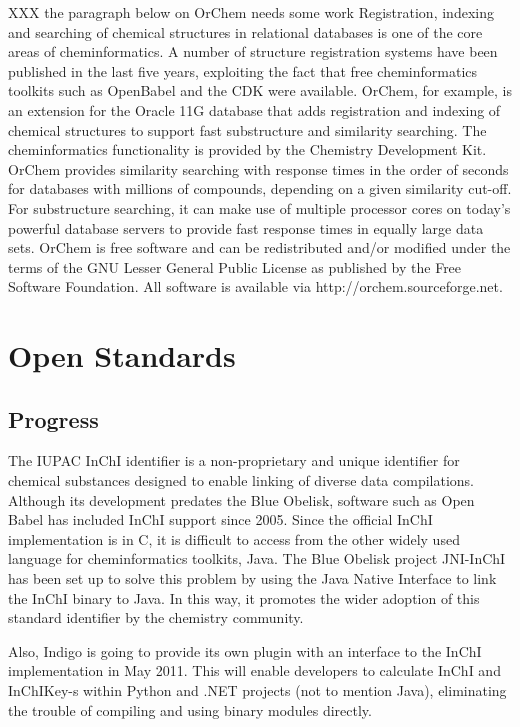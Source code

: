 \documentclass[10pt]{bmc_article}
\newenvironment{bmcformat}{\begin{raggedright}\baselineskip20pt\sloppy\setboolean{publ}{false}}{\end{raggedright}\baselineskip20pt\sloppy}
\begin{document}
\begin{bmcformat}
XXX the paragraph below on OrChem needs some work
Registration, indexing and searching of chemical structures in relational databases is one of the core areas of cheminformatics.
A number of structure registration systems have been published in the last five years, exploiting the fact that
free cheminformatics toolkits such as OpenBabel and the CDK were available.
OrChem, for example, is an extension for the Oracle 11G database that adds registration and indexing of chemical structures to support fast substructure and similarity searching. The cheminformatics functionality is provided by the Chemistry Development Kit. OrChem provides similarity searching with response times in the order of seconds for databases with millions of compounds, depending on a given similarity cut-off. For substructure searching, it can make use of multiple processor cores on today's powerful database servers to provide fast response times in equally large data sets.
OrChem is free software and can be redistributed and/or modified under the terms of the GNU Lesser General Public License as published by the Free Software Foundation. All software is available via http://orchem.sourceforge.net.

\section*{Open Standards}
  \subsection*{Progress}

The IUPAC InChI identifier is a non-proprietary and unique identifier
for chemical substances designed to enable linking of diverse data
compilations. Although its development predates the Blue Obelisk,
software such as Open Babel has included InChI support since 2005.
Since the official InChI implementation is in C, it is difficult to
access from the other widely used language for cheminformatics
toolkits, Java. The Blue Obelisk project JNI-InChI has been set up to
solve this problem by using the Java Native Interface to link the
InChI binary to Java. In this way, it promotes the wider adoption of
this standard identifier by the chemistry community.

Also, Indigo is going to provide its own plugin with an interface to
the InChI implementation in May 2011. This will enable developers to
calculate InChI and InChIKey-s within Python and .NET projects (not to
mention Java), eliminating the trouble of compiling and using binary
modules directly.


\end{bmcformat}
\end{document}
